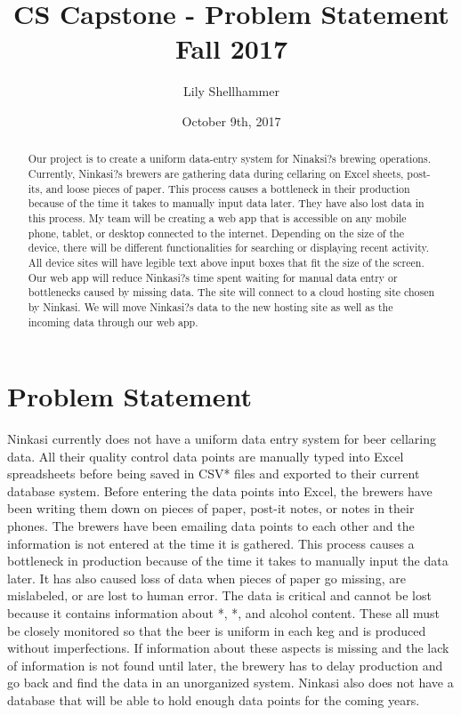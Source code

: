\documentclass[draftclsnofoot, onecolumn, letterpaper, 10pt]{IEEEtran}
\title{CS Capstone - Problem Statement \\ Fall 2017}
\author{Lily Shellhammer}
\date{October 9th, 2017}
\begin{document}
\begin{titlingpage}
\maketitle
	\begin{abstract}
	Our project is to create a uniform data-entry system for Ninaksi?s brewing operations. Currently, Ninkasi?s brewers are gathering data during cellaring on Excel sheets, post-its, and loose pieces of paper. This process causes a bottleneck in their production because of the time it takes to manually input data later. They have also lost data in this process. My team will be creating a web app that is accessible on any mobile phone, tablet, or desktop connected to the internet. Depending on the size of the device, there will be different functionalities for searching or displaying recent activity. All device sites will have legible text above input boxes that fit the size of the screen. Our web app will reduce Ninkasi?s time spent waiting for manual data entry or bottlenecks caused by missing data. The site will connect to a cloud hosting site chosen by Ninkasi. We will move Ninkasi?s data to the new hosting site as well as the incoming data through our web app. 
	\end{abstract}
\end{titlingpage}

\section{Problem Statement}
Ninkasi currently does not have a uniform data entry system for beer cellaring data.  All their quality control data points are manually typed into Excel spreadsheets before being saved in CSV* files and exported to their current database system. Before entering the data points into Excel, the brewers have been writing them down on pieces of paper, post-it notes, or notes in their phones. The brewers have been emailing data points to each other and the information is not entered at the time it is gathered. This process causes a bottleneck in production because of the time it takes to manually input the data later. It has also caused loss of data when pieces of paper go missing, are mislabeled, or are lost to human error. The data is critical and cannot be lost because it contains information about *, *, and alcohol content. These all must be closely monitored so that the beer is uniform in each keg and is produced without imperfections. If information about these aspects is missing and the lack of information is not found until later, the brewery has to delay production and go back and find the data in an unorganized system. Ninkasi also does not have a database that will be able to hold enough data points for the coming years. 
\end{document}
